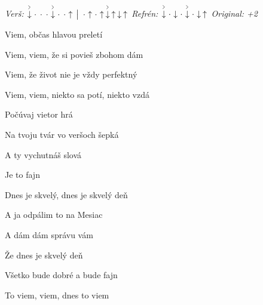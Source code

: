\begin{song}


 \quad
\textit{Verš:} $\AccentDown\Miss\Miss\Miss\AccentDown\Miss\Miss\Up \Separator \Miss\Up\Miss\Up\AccentDown\Up\Down\Up$ \quad
\textit{Refrén:} $\AccentDown\Miss\Down\Miss\AccentDown\Miss\Down\Up$ \quad
\textit{Original: +2}

\large


\Large

\bigskip

 Viem, občas hlavou preletí \par
Viem, viem, že si povieš zbohom dám  \par
{} Viem, že život nie je vždy perfektný \par
Viem, viem, niekto sa potí, niekto vzdá  \par

\bigskip

\begin{chorusbox}{\PredrefrenARefren}
Počúvaj vietor hrá  \par
{}Na tvoju tvár vo veršoch šepká \par
A ty vychutnáš slová \par
Je to fajn \par

\bigskip

Dnes je skvelý, dnes je skvelý deň \par
A ja odpálim to na Mesiac \par
A dám dám správu vám \par

\bigskip

Že dnes je skvelý deň \par
Všetko bude dobré a bude fajn \par
To viem, viem, dnes to viem \par
\end{chorusbox}

\bigskip


\end{song}
